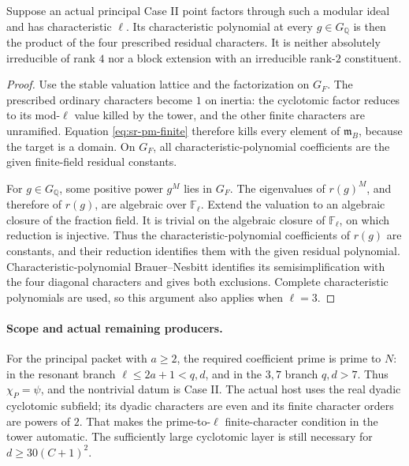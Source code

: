 \begin{srlemma}
\label{lem:sr-four-characteristic-ell}
Suppose an actual principal Case II point factors through such
a modular ideal and has characteristic \(\ell\).
Its characteristic polynomial at every \(g\in G_{\mathbb Q}\)
is then the product of the four prescribed residual characters.
It is neither absolutely irreducible of rank \(4\) nor a block
extension with an irreducible rank-\(2\) constituent.
\end{srlemma}
\begin{proof}
Use the stable valuation lattice and the factorization on \(G_F\).
The prescribed ordinary characters become \(1\) on inertia:
the cyclotomic factor reduces to its mod-\(\ell\) value killed
by the tower, and the other finite characters are unramified.
Equation \eqref{eq:sr-pm-finite} therefore kills every element
of \(\mathfrak m_B\), because the target is a domain.
On \(G_F\), all characteristic-polynomial coefficients are the
given finite-field residual constants.

For \(g\in G_{\mathbb Q}\), some positive power \(g^M\) lies in
\(G_F\).
The eigenvalues of \(r(g)^M\), and therefore of \(r(g)\), are
algebraic over \(\mathbb F_\ell\).
Extend the valuation to an algebraic closure of the fraction
field. It is trivial on the algebraic closure of
\(\mathbb F_\ell\), on which reduction is injective.
Thus the characteristic-polynomial coefficients of \(r(g)\)
are constants, and their reduction identifies them with the
given residual polynomial.
Characteristic-polynomial Brauer--Nesbitt identifies its
semisimplification with the four diagonal characters and gives
both exclusions. Complete characteristic polynomials are used,
so this argument also applies when \(\ell=3\).
\end{proof}

\paragraph{Scope and actual remaining producers.}
For the principal packet with \(a\ge2\), the required coefficient
prime is prime to \(N\): in the resonant branch
\(\ell\le2a+1<q,d\), and in the \(3,7\) branch \(q,d>7\).
Thus \(\chi_P=\psi\), and the nontrivial datum is Case II.
The actual host uses the real dyadic cyclotomic subfield;
its dyadic characters are even and its finite character orders
are powers of \(2\).
That makes the prime-to-\(\ell\) finite-character condition in
the tower automatic. The sufficiently large cyclotomic layer
is still necessary for \(d\ge30(C+1)^2\).

